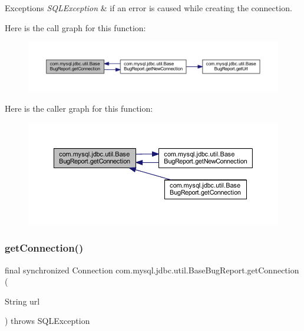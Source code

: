 \begin{DoxyExceptions}{Exceptions}
{\em S\+Q\+L\+Exception} & if an error is caused while creating the connection. \\
\hline
\end{DoxyExceptions}
Here is the call graph for this function\+:
\nopagebreak
\begin{figure}[H]
\begin{center}
\leavevmode
\includegraphics[width=350pt]{classcom_1_1mysql_1_1jdbc_1_1util_1_1_base_bug_report_a71060585627222c1d40f6cae3b2e9542_cgraph}
\end{center}
\end{figure}
Here is the caller graph for this function\+:
\nopagebreak
\begin{figure}[H]
\begin{center}
\leavevmode
\includegraphics[width=350pt]{classcom_1_1mysql_1_1jdbc_1_1util_1_1_base_bug_report_a71060585627222c1d40f6cae3b2e9542_icgraph}
\end{center}
\end{figure}
\mbox{\label{classcom_1_1mysql_1_1jdbc_1_1util_1_1_base_bug_report_ab8d73bffa10b18d975d64bde434fe4b7}} 
\subsubsection{\texorpdfstring{get\+Connection()}{getConnection()}\hspace{0.1cm}{\footnotesize\ttfamily [2/3]}}
{\footnotesize\ttfamily final synchronized Connection com.\+mysql.\+jdbc.\+util.\+Base\+Bug\+Report.\+get\+Connection (\begin{DoxyParamCaption}\item[{String}]{url }\end{DoxyParamCaption}) throws S\+Q\+L\+Exception}

